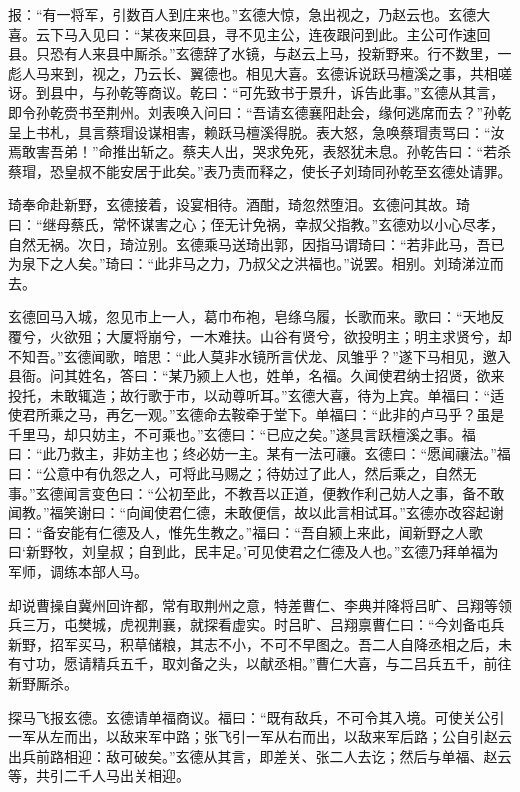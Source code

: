 报：“有一将军，引数百人到庄来也。”玄德大惊，急出视之，乃赵云也。玄德大喜。云下马入见曰：“某夜来回县，寻不见主公，连夜跟问到此。主公可作速回县。只恐有人来县中厮杀。”玄德辞了水镜，与赵云上马，投新野来。行不数里，一彪人马来到，视之，乃云长、翼德也。相见大喜。玄德诉说跃马檀溪之事，共相嗟讶。到县中，与孙乾等商议。乾曰：“可先致书于景升，诉告此事。”玄德从其言，即令孙乾赍书至荆州。刘表唤入问曰：“吾请玄德襄阳赴会，缘何逃席而去？”孙乾呈上书札，具言蔡瑁设谋相害，赖跃马檀溪得脱。表大怒，急唤蔡瑁责骂曰：“汝焉敢害吾弟！”命推出斩之。蔡夫人出，哭求免死，表怒犹未息。孙乾告曰：“若杀蔡瑁，恐皇叔不能安居于此矣。”表乃责而释之，使长子刘琦同孙乾至玄德处请罪。

琦奉命赴新野，玄德接着，设宴相待。酒酣，琦忽然堕泪。玄德问其故。琦曰：“继母蔡氏，常怀谋害之心；侄无计免祸，幸叔父指教。”玄德劝以小心尽孝，自然无祸。次日，琦泣别。玄德乘马送琦出郭，因指马谓琦曰：“若非此马，吾已为泉下之人矣。”琦曰：“此非马之力，乃叔父之洪福也。”说罢。相别。刘琦涕泣而去。

玄德回马入城，忽见市上一人，葛巾布袍，皂绦乌履，长歌而来。歌曰：“天地反覆兮，火欲殂；大厦将崩兮，一木难扶。山谷有贤兮，欲投明主；明主求贤兮，却不知吾。”玄德闻歌，暗思：“此人莫非水镜所言伏龙、凤雏乎？”遂下马相见，邀入县衙。问其姓名，答曰：“某乃颍上人也，姓单，名福。久闻使君纳士招贤，欲来投托，未敢辄造；故行歌于市，以动尊听耳。”玄德大喜，待为上宾。单福曰：“适使君所乘之马，再乞一观。”玄德命去鞍牵于堂下。单福曰：“此非的卢马乎？虽是千里马，却只妨主，不可乘也。”玄德曰：“已应之矣。”遂具言跃檀溪之事。福曰：“此乃救主，非妨主也；终必妨一主。某有一法可禳。玄德曰：“愿闻禳法。”福曰：“公意中有仇怨之人，可将此马赐之；待妨过了此人，然后乘之，自然无事。”玄德闻言变色曰：“公初至此，不教吾以正道，便教作利己妨人之事，备不敢闻教。”福笑谢曰：“向闻使君仁德，未敢便信，故以此言相试耳。”玄德亦改容起谢曰：“备安能有仁德及人，惟先生教之。”福曰：“吾自颍上来此，闻新野之人歌曰‘新野牧，刘皇叔；自到此，民丰足。’可见使君之仁德及人也。”玄德乃拜单福为军师，调练本部人马。

却说曹操自冀州回许都，常有取荆州之意，特差曹仁、李典并降将吕旷、吕翔等领兵三万，屯樊城，虎视荆襄，就探看虚实。时吕旷、吕翔禀曹仁曰：“今刘备屯兵新野，招军买马，积草储粮，其志不小，不可不早图之。吾二人自降丞相之后，未有寸功，愿请精兵五千，取刘备之头，以献丞相。”曹仁大喜，与二吕兵五千，前往新野厮杀。

探马飞报玄德。玄德请单福商议。福曰：“既有敌兵，不可令其入境。可使关公引一军从左而出，以敌来军中路；张飞引一军从右而出，以敌来军后路；公自引赵云出兵前路相迎：敌可破矣。”玄德从其言，即差关、张二人去讫；然后与单福、赵云等，共引二千人马出关相迎。

